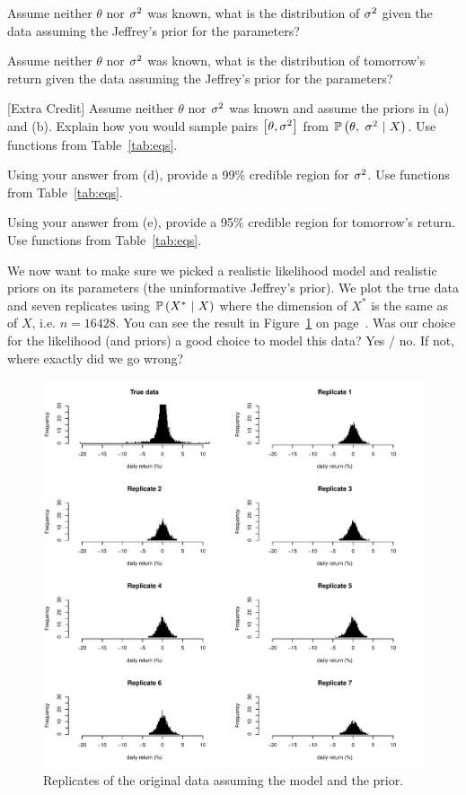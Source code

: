 \documentclass[12pt]{article}
\begin{document}
 Assume neither $\theta$ nor $\sigma^2$ was known, what is the distribution of $\sigma^2$ given the data assuming the Jeffrey's prior for the parameters? 

 Assume neither $\theta$ nor $\sigma^2$ was known, what is the distribution of tomorrow's return given the data assuming the Jeffrey's prior for the parameters? 

 [Extra Credit] Assume neither $\theta$ nor $\sigma^2$ was known and assume the priors in (a) and (b). Explain how you would sample pairs  $\left[\theta, \sigma^2\right]$ from $\mathbb{P}\left(\theta,~\sigma^2~|~X\right)$. Use functions from Table~\ref{tab:eqs}. 

 Using your answer from (d), provide a 99\% credible region for $\sigma^2$. Use functions from Table~\ref{tab:eqs}. 

 Using your answer from (e), provide a 95\% credible region for tomorrow's return. Use functions from Table~\ref{tab:eqs}. 

 We now want to make sure we picked a realistic likelihood model and realistic priors on its parameters (the uninformative Jeffrey's prior). We plot the true data and seven replicates using $\mathbb{P}\left(X^*~|~X\right)$ where the dimension of $X^*$ is the same as of $X$, i.e. $n=16428$. You can see the result in Figure~\ref{fig:model_check} on page~\pageref{fig:model_check}. Was our choice for the likelihood (and priors) a good choice to model this data? Yes / no. If not, where exactly did we go wrong? 



\eenum

\begin{figure}[h]
\centering
\includegraphics[width=7in]{data_and_reps}
\caption{Replicates of the original data assuming the model and the prior.}
\label{fig:model_check}
\end{figure}
\end{document}
